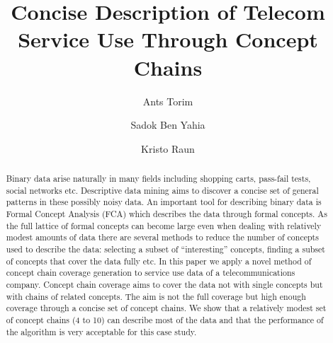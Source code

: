\documentclass[acmconf,authordraft]{acmart}
\begin{document}
\title{Concise Description of Telecom Service Use Through Concept Chains}

\author{Ants Torim}
\author{Sadok Ben Yahia}
\author{Kristo Raun}





\begin{abstract}
Binary data arise naturally in many fields including shopping carts, pass-fail tests, social networks etc. Descriptive data mining aims to discover a concise set of general patterns in these possibly noisy data. An important tool for describing binary data is Formal Concept Analysis (FCA) which describes the data through formal concepts. 
As the full lattice of formal concepts can become large even when dealing with relatively modest amounts of data  there are several methods to  reduce the number of concepts used to describe the data: selecting a subset of ``interesting''  concepts, finding a subset of  concepts that cover the data  fully etc.
In this paper we apply a novel method of concept chain coverage generation to service use data of a telecommunications company. Concept chain coverage aims to cover the data not with single concepts but with chains of related concepts. The aim is not the full coverage but high enough coverage through a concise set of concept chains. We show that a relatively modest set of concept chains (4 to 10) can describe most of the data and that the performance of the algorithm is very acceptable for this case study. 

\end{abstract}
\end{document}
